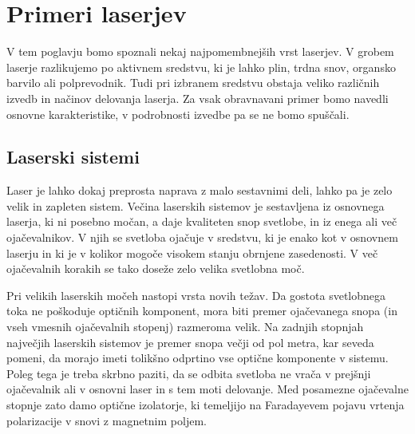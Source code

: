\chapter{Primeri laserjev}
\label{chap:Primeri}
V tem poglavju bomo spoznali nekaj najpomembnejših vrst laserjev.
V grobem laserje razlikujemo po aktivnem sredstvu, ki je lahko plin, trdna snov, 
organsko barvilo ali polprevodnik. Tudi pri izbranem
sredstvu obstaja veliko različnih izvedb in načinov delovanja laserja. Za vsak 
obravnavani primer bomo navedli osnovne karakteristike, v podrobnosti 
izvedbe pa se ne bomo spuščali. 

\section{Laserski sistemi}
Laser  je lahko dokaj preprosta naprava z malo sestavnimi deli, 
lahko pa je zelo velik in zapleten sistem. Večina laserskih sistemov
je sestavljena iz osnovnega laserja, ki ni posebno močan, a daje kvaliteten
snop svetlobe, in iz enega ali več ojačevalnikov. V njih se svetloba 
ojačuje v sredstvu, ki je enako kot v osnovnem laserju in ki je v kolikor 
mogoče visokem stanju obrnjene zasedenosti. V več ojačevalnih korakih 
se tako doseže zelo velika svetlobna moč. 

Pri velikih laserskih močeh nastopi vrsta novih težav. Da gostota 
svetlobnega toka ne poškoduje optičnih komponent, mora biti
premer ojačevanega snopa (in vseh vmesnih ojačevalnih stopenj) razmeroma velik. 
Na zadnjih stopnjah največjih laserskih sistemov je 
premer snopa večji od pol metra, kar seveda pomeni, da morajo imeti tolikšno odprtino 
vse optične komponente v sistemu. Poleg tega je
treba skrbno paziti, da se odbita svetloba ne vrača v prejšnji
ojačevalnik ali v osnovni laser in s tem moti delovanje. Med
posamezne ojačevalne stopnje zato damo optične izolatorje, ki temeljijo na Faradayevem
pojavu vrtenja polarizacije v snovi z magnetnim poljem.


